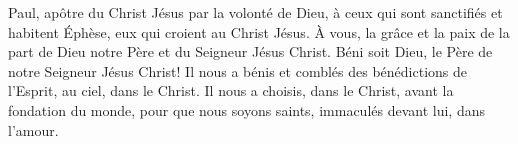 Paul, apôtre du Christ Jésus par la volonté de Dieu,
	à ceux qui sont sanctifiés et habitent Éphèse, eux qui croient au Christ Jésus.
À vous, la grâce et la paix de la part de Dieu notre Père et du Seigneur Jésus Christ.
Béni soit Dieu, le Père de notre Seigneur Jésus Christ!
	Il nous a bénis et comblés des bénédictions de l’Esprit, au ciel, dans le Christ.
Il nous a choisis, dans le Christ, avant la fondation du monde,
	pour que nous soyons saints, immaculés devant lui, dans l’amour.
